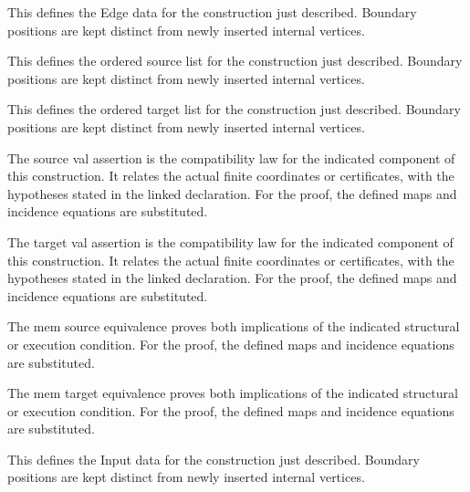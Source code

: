 This defines the Edge data for the construction just described. Boundary positions are kept distinct from newly inserted internal vertices.
\par{}

This defines the ordered source list for the construction just described. Boundary positions are kept distinct from newly inserted internal vertices.
\par{}

This defines the ordered target list for the construction just described. Boundary positions are kept distinct from newly inserted internal vertices.
\par{}

The source val assertion is the compatibility law for the indicated component of this construction. It relates the actual finite coordinates or certificates, with the hypotheses stated in the linked declaration.
For the proof, the defined maps and incidence equations are substituted.
\par{}

The target val assertion is the compatibility law for the indicated component of this construction. It relates the actual finite coordinates or certificates, with the hypotheses stated in the linked declaration.
For the proof, the defined maps and incidence equations are substituted.
\par{}

The mem source equivalence proves both implications of the indicated structural or execution condition.
For the proof, the defined maps and incidence equations are substituted.
\par{}

The mem target equivalence proves both implications of the indicated structural or execution condition.
For the proof, the defined maps and incidence equations are substituted.
\par{}

This defines the Input data for the construction just described. Boundary positions are kept distinct from newly inserted internal vertices.
\par{}

